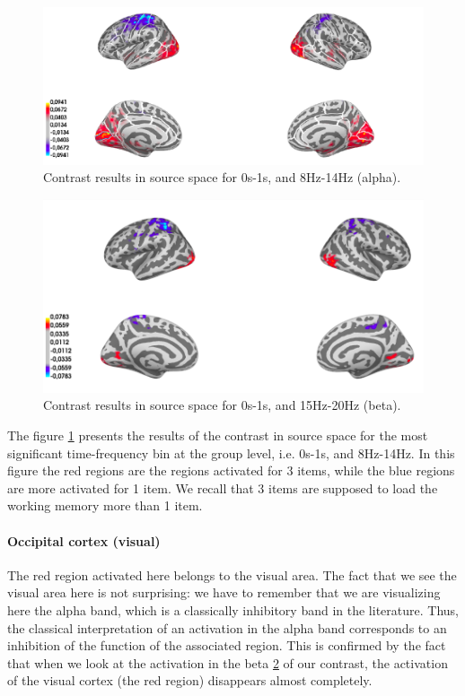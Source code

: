 \begin{figure}[ht]
    \centering
    \includegraphics[width=15cm]{images_report/source/source_results_3d_cropped.png}
    \caption[Contrast results in the source space (alpha)]%
    {Contrast results in source space for 0s-1s, and 8Hz-14Hz (alpha).}
    \label{results_source_space_alpha}
\end{figure}

\begin{figure}[ht]
    \centering
    \includegraphics[width=13cm]{images_report/source/source_results_beta_1s.png}
    \caption[Contrast results in the source space (beta)]%
    {Contrast results in source space for 0s-1s, and 15Hz-20Hz (beta).}
    \label{results_source_space_beta}
\end{figure}

The figure \ref{results_source_space_alpha} presents the results of the contrast in source space for the most significant time-frequency bin at the group level, i.e. 0s-1s, and 8Hz-14Hz. In this figure the red regions are the regions activated for 3 items, while the blue regions are more activated for 1 item. We recall that 3 items are supposed to load the working memory more than 1 item.

\paragraph{Occipital cortex (visual)}
\label{section:alpha_discussion}
The red region activated here belongs to the visual area. The fact that we see the visual area here is not surprising: we have to remember that we are visualizing here the alpha band, which is a classically inhibitory band in the literature. Thus, the classical interpretation of an activation in the alpha band corresponds to an inhibition of the function of the associated region. This is confirmed by the fact that when we look at the activation in the beta \ref{results_source_space_beta} of our contrast, the activation of the visual cortex (the red region) disappears almost completely.

